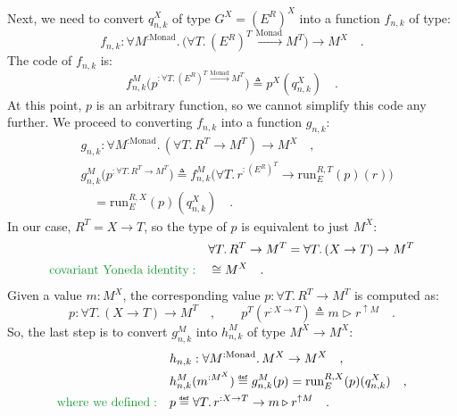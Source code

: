 Next, we need to convert $q_{n,k}^{X}$ of type $G^{X}=(E^{R})^{X}$
into a function $f_{n,k}$ of type:
\[
f_{n,k}:\forall M^{:\text{Monad}}.\,\big(\forall T.\,(E^{R})^{T}\xrightarrow{\text{Monad}}M^{T}\big)\rightarrow M^{X}\quad.
\]
The code of $f_{n,k}$ is:
\[
f_{n,k}^{M}\big(p^{:\forall T.\,(E^{R})^{T}\xrightarrow{\text{Monad}}M^{T}}\big)\triangleq p^{X}(q_{n,k}^{X})\quad.
\]
At this point, $p$ is an arbitrary function, so we cannot simplify
this code any further. We proceed to converting $f_{n,k}$ into a
function $g_{n,k}$:
\begin{align*}
 & g_{n,k}:\forall M^{:\text{Monad}}.\,(\forall T.\,R^{T}\rightarrow M^{T})\rightarrow M^{X}\quad,\\
 & g_{n,k}^{M}\big(p^{:\forall T.\,R^{T}\rightarrow M^{T}}\big)\triangleq f_{n,k}^{M}\big(\forall T.\,r^{:(E^{R})^{T}}\rightarrow\text{run}_{E}^{R,T}(p)(r)\big)\\
 & \quad=\text{run}_{E}^{R,X}(p)(q_{n,k}^{X})\quad.
\end{align*}
In our case, $R^{T}=X\rightarrow T$, so the type of $p$ is equivalent
to just $M^{X}$:
\begin{align*}
 & \forall T.\,R^{T}\rightarrow M^{T}=\forall T.\,(X\rightarrow T)\rightarrow M^{T}\\
{\color{greenunder}\text{covariant Yoneda identity}:}\quad & \cong M^{X}\quad.
\end{align*}
Given a value $m:M^{X}$, the corresponding value $p:\forall T.\,R^{T}\rightarrow M^{T}$
is computed as:
\[
p:\forall T.\,(X\rightarrow T)\rightarrow M^{T}\quad,\quad\quad p^{T}(r^{:X\rightarrow T})\triangleq m\triangleright r^{\uparrow M}\quad.
\]
So, the last step is to convert $g_{n,k}^{M}$ into $h_{n,k}^{M}$
of type $M^{X}\rightarrow M^{X}$:
\begin{align*}
 & h_{n,k}:\forall M^{:\text{Monad}}.\,M^{X}\rightarrow M^{X}\quad,\\
 & h_{n,k}^{M}(m^{:M^{X}})\triangleq g_{n,k}^{M}(p)=\text{run}_{E}^{R,X}(p)(q_{n,k}^{X})\quad,\\
{\color{greenunder}\text{where we defined}:}\quad & p\triangleq\forall T.\,r^{:X\rightarrow T}\rightarrow m\triangleright r^{\uparrow M}\quad.
\end{align*}

